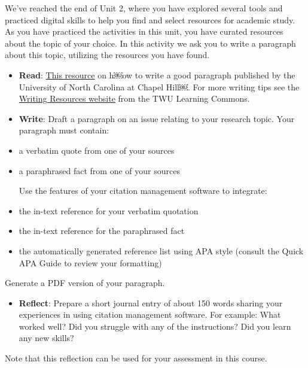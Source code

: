 \documentclass[
  letterpaper,
  DIV=11,
  numbers=noendperiod]{scrreprt}
\providecommand{\tightlist}{%
  \setlength{\itemsep}{0pt}\setlength{\parskip}{0pt}}\usepackage{longtable,booktabs,array}
\begin{document}
\begin{tcolorbox}[enhanced jigsaw, toprule=.15mm, colback=white, colframe=quarto-callout-note-color-frame, bottomtitle=1mm, leftrule=.75mm, coltitle=black, titlerule=0mm, rightrule=.15mm, colbacktitle=quarto-callout-note-color!10!white, left=2mm, title={Learning Activity}, opacitybacktitle=0.6, opacityback=0, breakable, toptitle=1mm, arc=.35mm, bottomrule=.15mm]

We've reached the end of Unit 2, where you have explored several tools
and practiced digital skills to help you find and select resources for
academic study. As you have practiced the activities in this unit, you
have curated resources about the topic of your choice. In this activity
we ask you to write a paragraph about this topic, utilizing the
resources you have found.

\begin{itemize}
\item
  \textbf{Read}:
  \href{https://writingcenter.unc.edu/tips-and-tools/paragraphs/}{This
  resource} on h￼ow to write a good paragraph published by the
  University of North Carolina at Chapel Hill￼. For more writing tips
  see the
  \href{https://create.twu.ca/learningcommons/writing-resources/?_gl=1*1uail9b*_ga*NDk4NDk0OTI0LjE3MTY5MTYzNTc.*_ga_NZ4GVM10JT*MTcyNTY2MjM0My4xMTYuMS4xNzI1NjYyMzcwLjMzLjAuMA..}{Writing
  Resources website} from the TWU Learning Commons.
\item
  \textbf{Write}: Draft a paragraph on an issue relating to your
  research topic. Your paragraph must contain:
\item
  a verbatim quote from one of your sources
\item
  a paraphrased fact from one of your sources

  Use the features of your citation management software to integrate:
\item
  the in-text reference for your verbatim quotation
\item
  the in-text reference for the paraphrased fact
\item
  the automatically generated reference list using APA style (consult
  the Quick APA Guide to review your formatting)
\end{itemize}

Generate a PDF version of your paragraph.

\begin{itemize}
\tightlist
\item
  \textbf{Reflect}: Prepare a short journal entry of about 150 words
  sharing your experiences in using citation management software. For
  example: What worked well? Did you struggle with any of the
  instructions? Did you learn any new skills?
\end{itemize}

Note that this reflection can be used for your assessment in this
course.

\end{tcolorbox}
\end{document}
